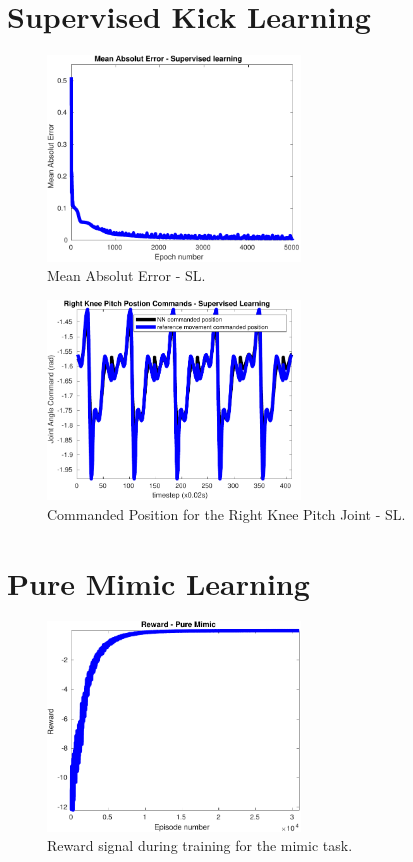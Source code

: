 
\section{Supervised Kick Learning}

\begin{figure}[H]
    \centering
    \includegraphics[width=0.6\textwidth]{Chapter7/plots/plot_MAE_supervised.pdf} 
    \caption{Mean Absolut Error - SL.}
    \label{fig:SL_MAE}
\end{figure}

\begin{figure}[H]
    \centering
    \includegraphics[width=0.6\textwidth]{Chapter7/plots/plot_joints_pos_superv.pdf} 
    \caption{Commanded Position for the Right Knee Pitch Joint - SL.}
    \label{fig:SL_cmd_pos}
\end{figure}

\section{Pure Mimic Learning}

\begin{figure}[H]
    \centering
    \includegraphics[width=0.6\textwidth]{Chapter7/plots/plot_reward_mimic.pdf} 
    \caption{Reward signal during training for the mimic task.}
    \label{fig:RL_mimic_reward}
\end{figure}

